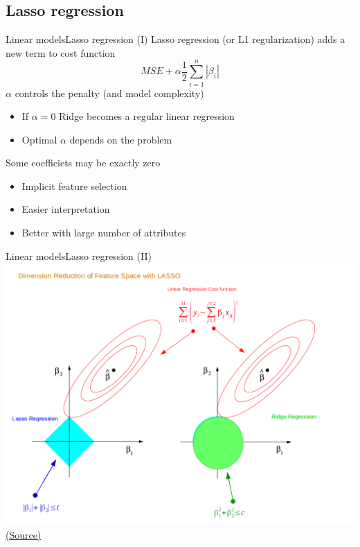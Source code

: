 \documentclass[10pt,compress]{beamer} %
\begin{document}
\subsection{Lasso regression}
\begin{frame}{Linear models}{Lasso regression (I)}
	Lasso regression (or L1 regularization) adds a new term to cost function
    \begin{equation*}
        MSE + \alpha \frac{1}{2} \sum_{i=1}^n |\beta_i|
    \end{equation*}
    $\alpha$ controls the penalty (and model complexity)
	\begin{itemize}
		\item If $\alpha = 0$ Ridge becomes a regular linear regression
        \item Optimal $\alpha$ depends on the problem
	\end{itemize}

    Some coefficiets may be exactly zero
    \begin{itemize}
        \item Implicit feature selection
        \item Easier interpretation
        \item Better with large number of attributes
    \end{itemize}
\end{frame}

\begin{frame}{Linear models}{Lasso regression (II)}
    \centering \includegraphics[width=0.7\linewidth]{figs/lasso-ridge.png}\\
    \tiny{\href{https://towardsdatascience.com/ridge-and-lasso-regression-a-complete-guide-with-python-scikit-learn-e20e34bcbf0b}{(Source)}}
\end{frame}
\end{document}
